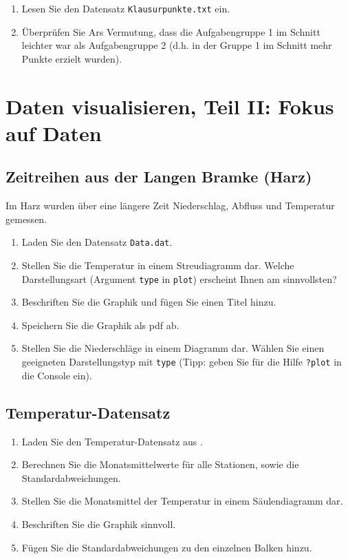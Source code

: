 \documentclass[]{book}
\providecommand{\tightlist}{%
  \setlength{\itemsep}{0pt}\setlength{\parskip}{0pt}}
\begin{document}
\begin{enumerate}
\def\labelenumi{\arabic{enumi}.}
\tightlist
\item
  Lesen Sie den Datensatz \texttt{Klausurpunkte.txt} ein.
\item
  Überprüfen Sie Ars Vermutung, dass die Aufgabengruppe 1 im Schnitt leichter war als Aufgabengruppe 2 (d.h. in der Gruppe 1 im Schnitt mehr Punkte erzielt wurden).
\end{enumerate}

\hypertarget{daten-visualisieren-teil-ii-fokus-auf-daten}{%
\section{Daten visualisieren, Teil II: Fokus auf Daten}\label{daten-visualisieren-teil-ii-fokus-auf-daten}}

\hypertarget{zeitreihen-aus-der-langen-bramke-harz}{%
\subsection{Zeitreihen aus der Langen Bramke (Harz)}\label{zeitreihen-aus-der-langen-bramke-harz}}

Im Harz wurden über eine längere Zeit Niederschlag, Abfluss und Temperatur gemessen.

\begin{enumerate}
\def\labelenumi{\arabic{enumi}.}
\tightlist
\item
  Laden Sie den Datensatz \texttt{Data.dat}.
\item
  Stellen Sie die Temperatur in einem Streudiagramm dar. Welche Darstellungsart (Argument \texttt{type} in \texttt{plot}) erscheint Ihnen am sinnvollsten?
\item
  Beschriften Sie die Graphik und fügen Sie einen Titel hinzu.
\item
  Speichern Sie die Graphik als pdf ab.
\item
  Stellen Sie die Niederschläge in einem Diagramm dar. Wählen Sie einen geeigneten Darstellungstyp mit \texttt{type} (Tipp: geben Sie für die Hilfe \texttt{?plot} in die Console ein).
\end{enumerate}

\hypertarget{temperatur-datensatz}{%
\subsection{Temperatur-Datensatz}\label{temperatur-datensatz}}

\begin{enumerate}
\def\labelenumi{\arabic{enumi}.}
\tightlist
\item
  Laden Sie den Temperatur-Datensatz aus \citet{Zuur2009a}.
\item
  Berechnen Sie die Monatsmittelwerte für alle Stationen, sowie die Standardabweichungen.
\item
  Stellen Sie die Monatsmittel der Temperatur in einem Säulendiagramm dar.
\item
  Beschriften Sie die Graphik sinnvoll.
\item
  Fügen Sie die Standardabweichungen zu den einzelnen Balken hinzu.
\end{enumerate}
\end{document}
